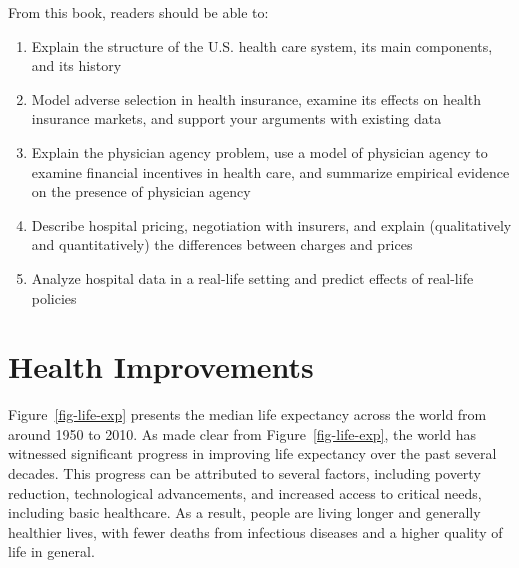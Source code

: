 \documentclass[
  letterpaper,
  DIV=11,
  numbers=noendperiod]{scrreport}
\providecommand{\tightlist}{%
  \setlength{\itemsep}{0pt}\setlength{\parskip}{0pt}}\usepackage{longtable,booktabs,array}
\theoremstyle{definition}
\theoremstyle{remark}
\begin{document}
From this book, readers should be able to:

\begin{enumerate}
\def\labelenumi{\arabic{enumi}.}
\tightlist
\item
  Explain the structure of the U.S. health care system, its main
  components, and its history
\item
  Model adverse selection in health insurance, examine its effects on
  health insurance markets, and support your arguments with existing
  data
\item
  Explain the physician agency problem, use a model of physician agency
  to examine financial incentives in health care, and summarize
  empirical evidence on the presence of physician agency
\item
  Describe hospital pricing, negotiation with insurers, and explain
  (qualitatively and quantitatively) the differences between charges and
  prices
\item
  Analyze hospital data in a real-life setting and predict effects of
  real-life policies
\end{enumerate}

\hypertarget{health-improvements}{%
\section*{Health Improvements}\label{health-improvements}}


Figure~\ref{fig-life-exp} presents the median life expectancy across the
world from around 1950 to 2010. As made clear from
Figure~\ref{fig-life-exp}, the world has witnessed significant progress
in improving life expectancy over the past several decades. This
progress can be attributed to several factors, including poverty
reduction, technological advancements, and increased access to critical
needs, including basic healthcare. As a result, people are living longer
and generally healthier lives, with fewer deaths from infectious
diseases and a higher quality of life in general.
\end{document}
